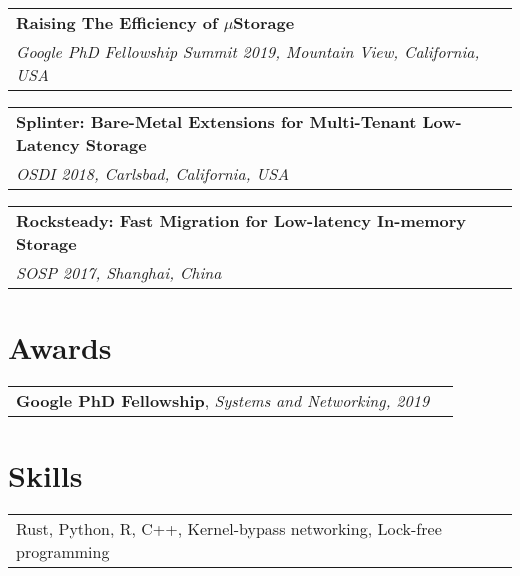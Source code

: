 \documentclass[margin,line]{res}
\begin{document}
\begin{resume}
\vspace{-7pt}
\begin{tabular}{@{}p{5.5in}p{4in}}
{\bf Raising The Efficiency of $\mu$Storage}\\
{\small\em Google PhD Fellowship Summit 2019, Mountain View, California,
USA}\\
\end{tabular}

\vspace{-7pt}
\begin{tabular}{@{}p{5.5in}p{4in}}
{\bf Splinter: Bare-Metal Extensions for Multi-Tenant Low-Latency Storage}\\
{\small\em OSDI 2018, Carlsbad, California, USA}\\
\end{tabular}

\vspace{-7pt}
\begin{tabular}{@{}p{5.5in}p{4in}}
{\bf Rocksteady: Fast Migration for Low-latency In-memory Storage}\\
{\small\em SOSP 2017, Shanghai, China}\\
\end{tabular}

\section{\sc Awards}
\begin{tabular}{@{}p{5.5in}p{4in}}
{\bf Google PhD Fellowship}, {\small\em Systems and Networking, 2019}\\
\end{tabular}

\section{\sc Skills}
\begin{tabular}{@{}p{5.5in}p{4in}}
Rust, Python, R, C++, Kernel-bypass networking, Lock-free programming
\end{tabular}

\end{resume}
\end{document}
